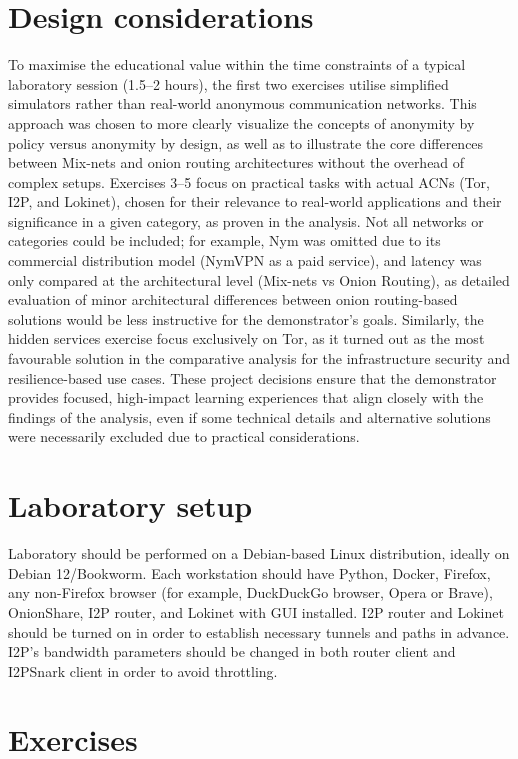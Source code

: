\section{Design considerations}
To maximise the educational value within the time constraints of a typical laboratory session (1.5–2 hours), the first two exercises utilise simplified simulators rather than real-world anonymous communication networks. This approach was chosen to more clearly visualize the concepts of anonymity by policy versus anonymity by design, as well as to illustrate the core differences between Mix-nets and onion routing architectures without the overhead of complex setups. Exercises 3–5 focus on practical tasks with actual ACNs (Tor, I2P, and Lokinet), chosen for their relevance to real-world applications and their significance in a given category, as proven in the analysis. Not all networks or categories could be included; for example, Nym was omitted due to its commercial distribution model (NymVPN as a paid service), and latency was only compared at the architectural level (Mix-nets vs Onion Routing), as detailed evaluation of minor architectural differences between onion routing-based solutions would be less instructive for the demonstrator’s goals. Similarly, the hidden services exercise focus exclusively on Tor, as it turned out as the most favourable solution in the comparative analysis for the infrastructure security and resilience-based use cases. These project decisions ensure that the demonstrator provides focused, high-impact learning experiences that align closely with the findings of the analysis, even if some technical details and alternative solutions were necessarily excluded due to practical considerations.

\section{Laboratory setup}
Laboratory should be performed on a Debian-based Linux distribution, ideally on Debian 12/Bookworm. Each workstation should have Python, Docker, Firefox, any non-Firefox browser (for example, DuckDuckGo browser, Opera or Brave), OnionShare, I2P router, and Lokinet with GUI installed. I2P router and Lokinet should be turned on in order to establish necessary tunnels and paths in advance. I2P's bandwidth parameters should be changed in both router client and I2PSnark client in order to avoid throttling.

\section{Exercises}

